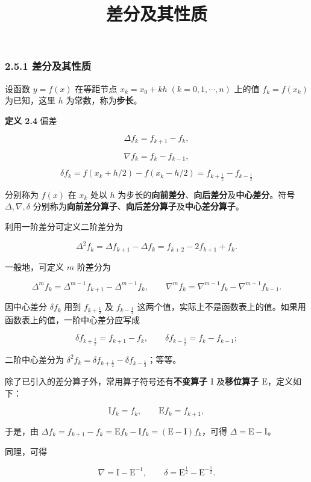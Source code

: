 \documentclass[
  10pt,
  fontset=fandol]{ctexart}
\title{差分及其性质}
\author{}
\date{}
\begin{document}
\maketitle

\subsubsection{2.5.1 差分及其性质}\label{ux5deeux5206ux53caux5176ux6027ux8d28}

设函数 \(y=f(x)\) 在等距节点 \(x_k=x_0+kh\;(k=0,1,\cdots,n)\) 上的值 \(f_k=f(x_k)\) 为已知，这里 \(h\) 为常数，称为\textbf{步长}。

\textbf{定义 2.4} 偏差

\[
\Delta f_k=f_{k+1}-f_k,
\tag{2.5.1}
\]

\[
\nabla f_k=f_k-f_{k-1},
\tag{2.5.2}
\]

\[
\delta f_k=f(x_k+h/2)-f(x_k-h/2)=f_{k+\frac12}-f_{k-\frac12}
\tag{2.5.3}
\]

分别称为 \(f(x)\) 在 \(x_k\) 处以 \(h\) 为步长的\textbf{向前差分}、\textbf{向后差分}及\textbf{中心差分}。符号 \(\Delta,\nabla,\delta\) 分别称为\textbf{向前差分算子}、\textbf{向后差分算子}及\textbf{中心差分算子}。

利用一阶差分可定义二阶差分为

\[
\Delta^2 f_k=\Delta f_{k+1}-\Delta f_k=f_{k+2}-2f_{k+1}+f_k.
\]

一般地，可定义 \(m\) 阶差分为

\[
\Delta^m f_k=\Delta^{m-1}f_{k+1}-\Delta^{m-1}f_k,\qquad
\nabla^m f_k=\nabla^{m-1}f_k-\nabla^{m-1}f_{k-1}.
\]

因中心差分 \(\delta f_k\) 用到 \(f_{k+\frac12}\) 及 \(f_{k-\frac12}\) 这两个值，实际上不是函数表上的值。如果用函数表上的值，一阶中心差分应写成

\[
\delta f_{k+\frac12}=f_{k+1}-f_k,\qquad
\delta f_{k-\frac12}=f_k-f_{k-1};
\]

二阶中心差分为 \(\delta^2 f_k=\delta f_{k+\frac12}-\delta f_{k-\frac12}\)；等等。

除了已引入的差分算子外，常用算子符号还有\textbf{不变算子 \(\mathrm{I}\)} 及\textbf{移位算子 \(\mathrm{E}\)}，定义如下：

\[
\mathrm{I}f_k=f_k,\qquad\mathrm{E}f_k=f_{k+1},
\]

于是，由 \(\Delta f_k=f_{k+1}-f_k=\mathrm{E}f_k-\mathrm{I}f_k=(\mathrm{E}-\mathrm{I})f_k\)，可得 \(\Delta=\mathrm{E}-\mathrm{I}\)。

同理，可得

\[
\nabla=\mathrm{I}-\mathrm{E}^{-1},\qquad
\delta=\mathrm{E}^{\frac12}-\mathrm{E}^{-\frac12}.
\]
\end{document}
